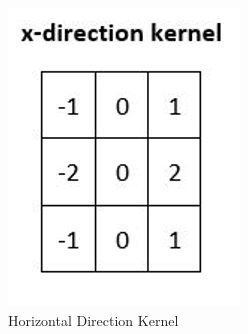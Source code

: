 \documentclass[conference]{IEEEtran}
\begin{document}
\begin{figure}[ht]
  \centering
  \begin{subfigure}[b]{0.45\linewidth}
    \includegraphics[width=\linewidth]{images/Picture8.png}
    \caption{Horizontal Direction Kernel}
  \end{subfigure}
  \begin{subfigure}[b]{0.45\linewidth}

\end{subfigure}
\end{figure}
\end{document}
